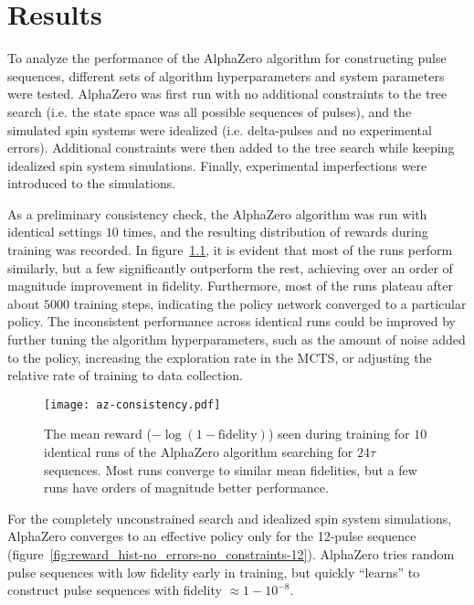 \chapter{Results}

To analyze the performance of the AlphaZero algorithm for constructing pulse sequences, different sets of algorithm hyperparameters and system parameters were tested. AlphaZero was first run with no additional constraints to the tree search (i.e. the state space was all possible sequences of pulses), and the simulated spin systems were idealized (i.e. delta-pulses and no experimental errors). Additional constraints were then added to the tree search while keeping idealized spin system simulations. Finally, experimental imperfections were introduced to the simulations.



As a preliminary consistency check, the AlphaZero algorithm was run with identical settings $10$ times, and the resulting distribution of rewards during training was recorded. In figure~\ref{fig:az-consistency}, it is evident that most of the runs perform similarly, but a few significantly outperform the rest, achieving over an order of magnitude improvement in fidelity. Furthermore, most of the runs plateau after about $5000$ training steps, indicating the policy network converged to a particular policy. The inconsistent performance across identical runs could be improved by further tuning the algorithm hyperparameters, such as the amount of noise added to the policy, increasing the exploration rate in the MCTS, or adjusting the relative rate of training to data collection.

\begin{figure}[H]
    \centering
    \texttt{[image: az-consistency.pdf]}
    \caption{The mean reward ($-\log(1-\text{fidelity})$) seen during training for $10$ identical runs of the AlphaZero algorithm searching for $24\tau$ sequences. Most runs converge to similar mean fidelities, but a few runs have orders of magnitude better performance.}
    \label{fig:az-consistency}
\end{figure}


For the completely unconstrained search and idealized spin system simulations, AlphaZero converges to an effective
policy only for the 12-pulse sequence (figure~\ref{fig:reward_hist-no_errors-no_constraints-12}). AlphaZero tries random pulse sequences with low fidelity early in training, but quickly ``learns'' to construct pulse sequences with fidelity $\approx 1 - 10^{-8}$.

